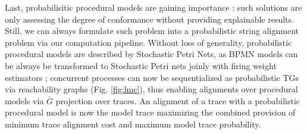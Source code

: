  
Last, probabilisitic procedural models are gaining importance \cite{DBLP:conf/bpm/LeemansSA19,DBLP:conf/icpm/PolyvyanyyK19,DBLP:journals/tosem/PolyvyanyySWCM20}: such solutions are only assessing the degree of conformance without providing explainable results. Still, we can always formulate such problem into a probabilistic string alignment problem via our computation pipeline.
Without loss of generality, probabilistic procedural models are described by Stochastic Petri Nets, as BPMN models can be always be transformed to Stochastic Petri nets \cite{RaedtsPUWGS07} joinly with firing weight estimators \cite{spdwe}; concurrent processes can now be sequentialized as probabilistic TGs via reachability graphs (Fig. \ref{fig:lmc}), thus enabling  alignments over procedural models via $\overline{G}$ projection over traces. An alignment of a trace with a probabilistic procedural model is now the model trace maximizing the combined provision of minimum trace alignment cost and maximum model trace probability. 
 







